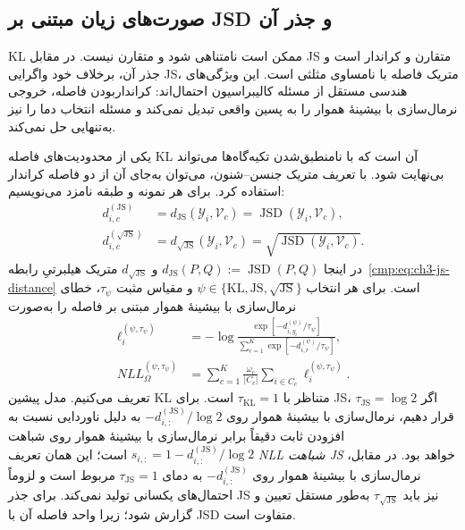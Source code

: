\subsection{صورت‌های زیان مبتنی بر JSD و جذر آن}
\label{cmp:subsec:ch3-NLL-JS-sqrt-variants}

KL ممکن است نامتناهی شود و متقارن نیست.
در مقابل JS متقارن و کراندار است و
جذر آن، برخلاف خود واگرایی JS،
متریک فاصله با نامساوی مثلثی است.
این ویژگی‌های هندسی مستقل از مسئله
کالیبراسیون احتمال‌اند: کرانداربودن
فاصله، خروجی نرمال‌سازی با بیشینهٔ هموار را به پسین واقعی تبدیل
نمی‌کند و مسئله انتخاب دما را نیز
به‌تنهایی حل نمی‌کند.

یکی از محدودیت‌های فاصله KL آن است که با نامنطبق‌شدن
تکیه‌گاه‌ها می‌تواند بی‌نهایت شود. با تعریف متریک
جنسن--شنون، می‌توان به‌جای آن از دو فاصله کراندار
استفاده کرد. برای هر نمونه و طبقه نامزد می‌نویسیم:
\begin{equation}\label{cmp:eq:ch3-NLL-JS-distances}
\begin{aligned}
d_{i,c}^{(\mathrm{JS})}
&=d_{\mathrm{JS}}(\mathscr Y_i,\mathcal V_c)
=\operatorname{JSD}(\mathscr Y_i,\mathcal V_c),\\
d_{i,c}^{(\sqrt{\mathrm{JS}})}
&=d_{\sqrt{\mathrm{JS}}}(\mathscr Y_i,\mathcal V_c)
=\sqrt{\operatorname{JSD}(\mathscr Y_i,\mathcal V_c)}.
\end{aligned}
\end{equation}
در اینجا $d_{\mathrm{JS}}(P,Q):=\operatorname{JSD}(P,Q)$
و $d_{\sqrt{\mathrm{JS}}}$ متریک هیلبرتیِ
رابطه~\eqref{cmp:eq:ch3-js-distance} است.
برای هر انتخاب $\psi\in\{\mathrm{KL},\mathrm{JS},
\sqrt{\mathrm{JS}}\}$ و مقیاس مثبت
$\tau_\psi$، خطای نرمال‌سازی با بیشینهٔ هموار مبتنی بر فاصله را به‌صورت
\begin{equation}\label{cmp:eq:ch3-NLL-distance-family}
\boxed{
\begin{aligned}
\ell_i^{(\psi,\tau_\psi)}
&=-\log\frac{\exp[-d_{i,y_i}^{(\psi)}/\tau_\psi]}
{\sum_{r=1}^{K}\exp[-d_{i,r}^{(\psi)}/\tau_\psi]},\\
NLL^{(\psi,\tau_\psi)}_\Omega
&=\sum_{c=1}^{K}\frac{\omega_c}{|C_c|}
\sum_{i\in C_c}\ell_i^{(\psi,\tau_\psi)}.
\end{aligned}}
\end{equation}
تعریف می‌کنیم. مدل پیشین KL متناظر با $\tau_{\mathrm{KL}}=1$
است. برای JS، اگر $\tau_{\mathrm{JS}}=\log2$ قرار دهیم،
نرمال‌سازی با بیشینهٔ هموار روی $-d_{i,:}^{(\mathrm{JS})}/\log2$ به دلیل
ناوردایی نسبت به افزودن ثابت دقیقاً برابر نرمال‌سازی با بیشینهٔ هموار
روی شباهت $s_{i,:}=1-d_{i,:}^{(\mathrm{JS})}/\log2$ است؛
این همان تعریف \emph{NLL شباهت JS} خواهد بود.
در مقابل، نرمال‌سازی با بیشینهٔ هموار روی $-d_{i,:}^{(\mathrm{JS})}$
به دمای $\tau_{\mathrm{JS}}=1$ مربوط است و
لزوماً احتمال‌های یکسانی تولید نمی‌کند.
برای جذر JS نیز باید $\tau_{\sqrt{\mathrm{JS}}}$
به‌طور مستقل تعیین و گزارش شود؛ زیرا واحد
فاصله آن با JSD متفاوت است.

